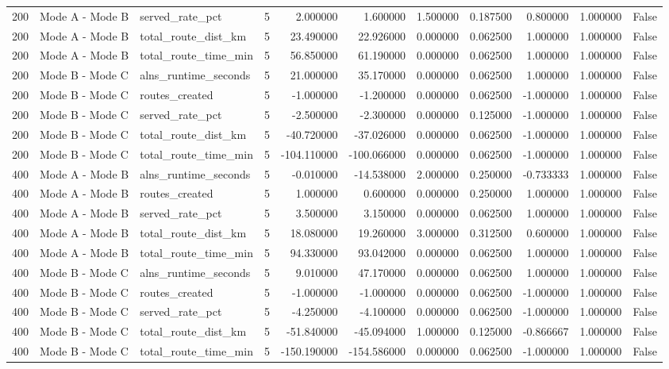 \begin{table}[!t]
{\begin{tabular}{rllrrrrrrrr}
200 & Mode A - Mode B & served\_rate\_pct & 5 & 2.000000 & 1.600000 & 1.500000 & 0.187500 & 0.800000 & 1.000000 & False \\
200 & Mode A - Mode B & total\_route\_dist\_km & 5 & 23.490000 & 22.926000 & 0.000000 & 0.062500 & 1.000000 & 1.000000 & False \\
200 & Mode A - Mode B & total\_route\_time\_min & 5 & 56.850000 & 61.190000 & 0.000000 & 0.062500 & 1.000000 & 1.000000 & False \\
200 & Mode B - Mode C & alns\_runtime\_seconds & 5 & 21.000000 & 35.170000 & 0.000000 & 0.062500 & 1.000000 & 1.000000 & False \\
200 & Mode B - Mode C & routes\_created & 5 & -1.000000 & -1.200000 & 0.000000 & 0.062500 & -1.000000 & 1.000000 & False \\
200 & Mode B - Mode C & served\_rate\_pct & 5 & -2.500000 & -2.300000 & 0.000000 & 0.125000 & -1.000000 & 1.000000 & False \\
200 & Mode B - Mode C & total\_route\_dist\_km & 5 & -40.720000 & -37.026000 & 0.000000 & 0.062500 & -1.000000 & 1.000000 & False \\
200 & Mode B - Mode C & total\_route\_time\_min & 5 & -104.110000 & -100.066000 & 0.000000 & 0.062500 & -1.000000 & 1.000000 & False \\
400 & Mode A - Mode B & alns\_runtime\_seconds & 5 & -0.010000 & -14.538000 & 2.000000 & 0.250000 & -0.733333 & 1.000000 & False \\
400 & Mode A - Mode B & routes\_created & 5 & 1.000000 & 0.600000 & 0.000000 & 0.250000 & 1.000000 & 1.000000 & False \\
400 & Mode A - Mode B & served\_rate\_pct & 5 & 3.500000 & 3.150000 & 0.000000 & 0.062500 & 1.000000 & 1.000000 & False \\
400 & Mode A - Mode B & total\_route\_dist\_km & 5 & 18.080000 & 19.260000 & 3.000000 & 0.312500 & 0.600000 & 1.000000 & False \\
400 & Mode A - Mode B & total\_route\_time\_min & 5 & 94.330000 & 93.042000 & 0.000000 & 0.062500 & 1.000000 & 1.000000 & False \\
400 & Mode B - Mode C & alns\_runtime\_seconds & 5 & 9.010000 & 47.170000 & 0.000000 & 0.062500 & 1.000000 & 1.000000 & False \\
400 & Mode B - Mode C & routes\_created & 5 & -1.000000 & -1.000000 & 0.000000 & 0.062500 & -1.000000 & 1.000000 & False \\
400 & Mode B - Mode C & served\_rate\_pct & 5 & -4.250000 & -4.100000 & 0.000000 & 0.062500 & -1.000000 & 1.000000 & False \\
400 & Mode B - Mode C & total\_route\_dist\_km & 5 & -51.840000 & -45.094000 & 1.000000 & 0.125000 & -0.866667 & 1.000000 & False \\
400 & Mode B - Mode C & total\_route\_time\_min & 5 & -150.190000 & -154.586000 & 0.000000 & 0.062500 & -1.000000 & 1.000000 & False \\
\bottomrule
\end{tabular}

}
\end{table}
